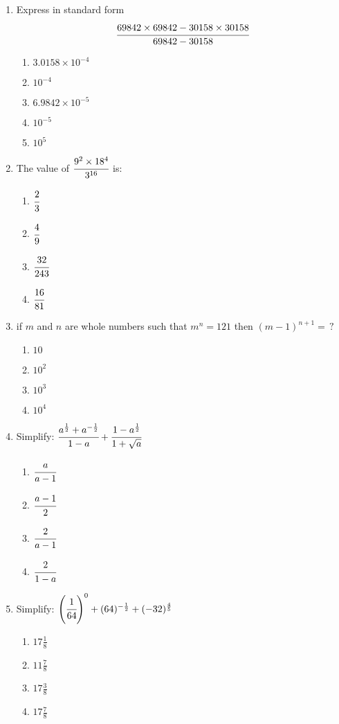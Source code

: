\begin{multicols}{2}
\begin{enumerate}[label={\arabic*.}]
\item Express in standard form $$\cfrac{69842 \times 69842 - 30158 \times 30158}{69842 - 30158}$$
	\begin{enumerate}[label={\Alph*.}]
	\item \(3.0158 \times 10^{-4}\)
	\item \(10^{-4}\)
	\item \(6.9842 \times 10^{-5}\)
	\item \(10^{-5}\)
	\item \(10^5\)
	\end{enumerate}
\item The value of $\cfrac{9^2 \times 18^4}{3^{16}}$ is:
	\begin{enumerate}[label={\Alph*.}]
	\item \(\cfrac{2}{3}\)
	\item \(\cfrac{4}{9}\)
	\item \(\cfrac{32}{243}\)
	\item \(\cfrac{16}{81}\)
	\end{enumerate}
\item if $m$ and $n$ are whole numbers such that $m^n = 121$ then $(m-1)^{n+1} = \,?$
	\begin{enumerate}[label={\Alph*.}]
	\item \(10\)
	\item \(10^2\)
	\item \(10^3\)
	\item \(10^4\)
	\end{enumerate}
\item Simplify: $\cfrac{a^\frac{1}{2} + a^{-\frac{1}{2}}}{1-a} + \cfrac{1- a^{\frac{1}{2}}}{1+ \sqrt{a}}$
	\begin{enumerate}[label={\Alph*.}]
	\item \(\cfrac{a}{a-1}\)
	\item \(\cfrac{a-1}{2}\)
	\item \(\cfrac{2}{a-1}\)
	\item \(\cfrac{2}{1-a}\)
	\end{enumerate}
\item Simplify: $\left(\cfrac{1}{64}\right)^0 + (64)^{-\frac{1}{2}} + (-32)^{\frac{4}{5}}$
	\begin{enumerate}[label={\Alph*.}]
	\item \(17\frac{1}{8}\)
	\item \(11\frac{7}{8}\)
	\item \(17\frac{3}{8}\)
	\item \(17\frac{7}{8}\)
	\end{enumerate}

\end{enumerate}
\end{multicols}
